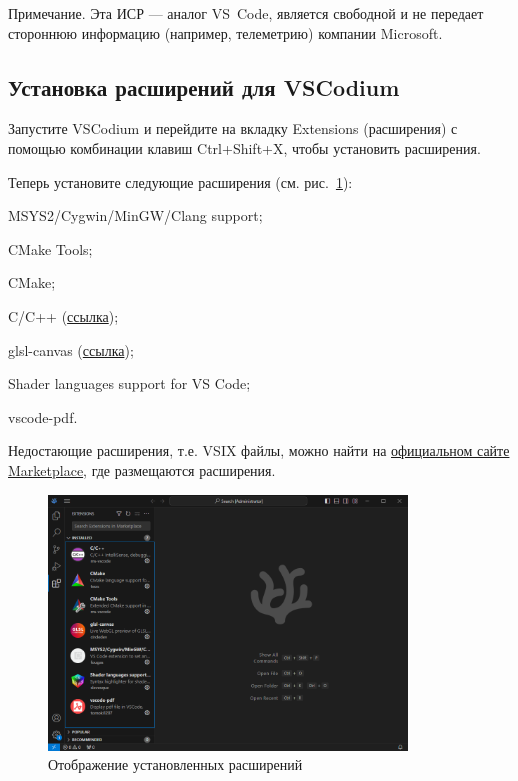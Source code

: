 \documentclass[a4paper,12pt]{article}
\renewenvironment{itemize}{
    \begin{list}{\labelitemi}{
    \setlength{\topsep}{0pt}
    \setlength{\partopsep}{6pt}
    \setlength{\parskip}{0pt}
    \setlength{\itemsep}{0pt}
    \setlength{\parsep}{0pt}
    }
}{\end{list}}
\begin{document}
        Примечание.       
        Эта ИСР --- аналог VS~Code, является свободной и не передает стороннюю информацию (например, телеметрию) компании Microsoft. 
        
        \subsection{Установка расширений для VSCodium}
        
        Запустите VSCodium и перейдите на вкладку Extensions (расширения) с помощью комбинации клавиш Ctrl+Shift+X, чтобы установить расширения.
        
        Теперь установите следующие расширения (см. рис.~\ref{fig:installed_extensions}):

        \begin{itemize}
            \item MSYS2/Cygwin/MinGW/Clang support;
            \item CMake Tools;
            \item CMake;
            \item C/C++ (\href{https://marketplace.visualstudio.com/items?itemName=ms-vscode.cpptools}{ссылка});
            \item glsl-canvas (\href{https://marketplace.visualstudio.com/items?itemName=circledev.glsl-canvas}{ссылка});
            \item Shader languages support for VS Code;
            \item vscode-pdf.
        \end{itemize}

        Недостающие расширения, т.е. VSIX файлы, можно найти на \href{https://marketplace.visualstudio.com/vscode}{официальном сайте Marketplace}, где размещаются расширения.
        
        \begin{figure}[H]
            \centering
			\includegraphics[width=0.85\textwidth]{images/Installed_extenstions.png}
			\caption {Отображение установленных расширений}
            \label{fig:installed_extensions}
        \end{figure}
        
\end{document}
